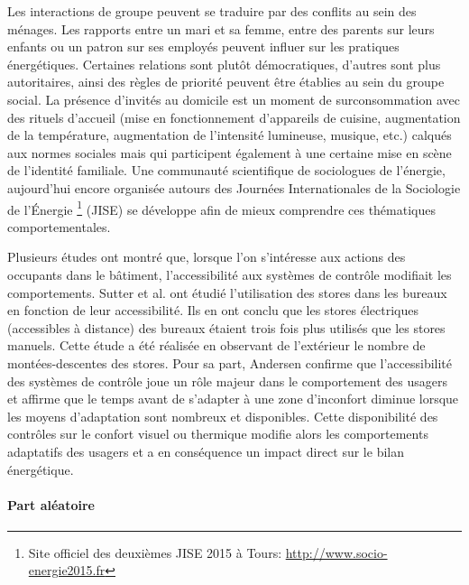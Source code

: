 
Les interactions de groupe peuvent se traduire par des conflits au sein des ménages. Les rapports entre un mari et sa femme, entre des parents sur leurs enfants ou un patron sur ses employés peuvent influer sur les pratiques énergétiques. Certaines relations sont plutôt démocratiques, d'autres sont plus autoritaires, ainsi des règles de priorité peuvent être établies au sein du groupe social. La présence d'invités au domicile est un moment de surconsommation avec des rituels d'accueil (mise en fonctionnement d'appareils de cuisine, augmentation de la température, augmentation de l'intensité lumineuse, musique, etc.) calqués aux normes sociales mais qui participent également à une certaine mise en scène de l'identité familiale. Une communauté scientifique de sociologues de l'énergie, aujourd'hui encore organisée autours des Journées Internationales de la Sociologie de l'Énergie \footnote{Site officiel des deuxièmes JISE 2015 à Tours: \url{http://www.socio-energie2015.fr}} (JISE) se développe afin de mieux comprendre ces thématiques comportementales. 


Plusieurs études ont montré que, lorsque l'on s'intéresse aux actions des occupants dans le bâtiment, l'accessibilité aux systèmes de contrôle modifiait les comportements. Sutter et al. \cite{Sutter-06} ont étudié l'utilisation des stores dans les bureaux en fonction de leur accessibilité. Ils en ont conclu que les stores électriques (accessibles à distance) des bureaux étaient trois fois plus utilisés que les stores manuels. Cette étude a été réalisée en observant de l'extérieur le nombre de montées-descentes des stores. Pour sa part, Andersen \cite{Andersen-09} confirme que l'accessibilité des systèmes de contrôle joue un rôle majeur dans le comportement des usagers et affirme que le temps avant de s'adapter à une zone d'inconfort diminue lorsque les moyens d'adaptation sont nombreux et disponibles. Cette disponibilité des contrôles sur le confort visuel ou thermique modifie alors les comportements adaptatifs des usagers et a en conséquence un impact direct sur le bilan énergétique.

\paragraph{Part aléatoire}

